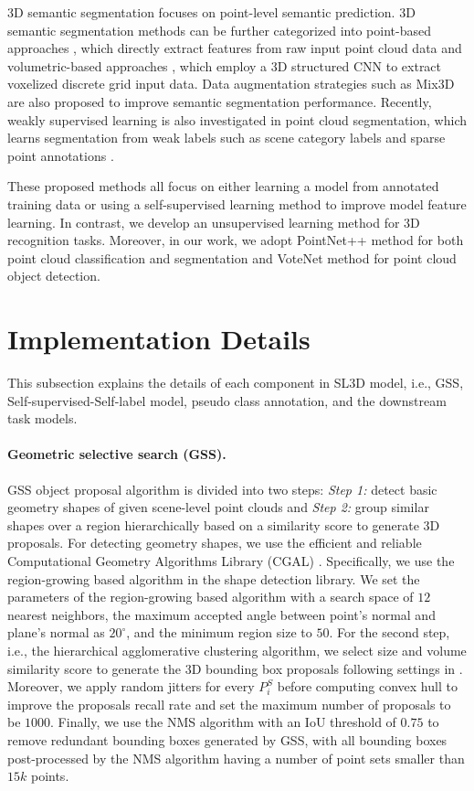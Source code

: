 \documentclass{article}
\begin{document}
{3D semantic segmentation} focuses on point-level semantic prediction. 3D semantic segmentation methods can be further categorized into point-based approaches \cite{qi2017pointnet,qi2017pointnetplusplus,zhao2021point,xu2021paconv}, which directly extract features from raw  input point cloud data and volumetric-based approaches \cite{choy20194d,graham20183d,hu2021bidirectional,hu2020jsenet} , which employ a 3D structured CNN to extract voxelized discrete grid input data. 
Data augmentation strategies such as Mix3D \cite{nekrasov2021mix3d} are also proposed to improve semantic segmentation performance. Recently, weakly supervised learning is also investigated in point cloud segmentation, which learns segmentation from weak labels such as scene category labels \cite{ren2021wypr} and sparse point annotations \cite{liu2021one}.

These proposed methods all focus on either learning a model from annotated training data or using a self-supervised learning method to improve model feature learning. In contrast, we develop an unsupervised learning method for 3D recognition tasks. Moreover, in our work, we adopt PointNet++ \cite{qi2017pointnetplusplus} method for both point cloud classification and segmentation and VoteNet \cite{qi2019deep} method for point cloud object detection. 

\section{Implementation Details}
\label{sec:implementation}
This subsection explains the details of each component in SL3D model, i.e., GSS, Self-supervised-Self-label model, pseudo class annotation, and the downstream task models.

\paragraph{Geometric selective search (GSS). }GSS object proposal algorithm is divided into two steps: \textit{Step 1: } detect basic geometry shapes of given scene-level point clouds and \textit{Step 2: } group similar shapes over a region hierarchically based on a similarity score to generate 3D proposals. For detecting geometry shapes, we use the efficient and reliable Computational Geometry Algorithms Library (CGAL) \cite{fabri2009cgal}. Specifically, we use the region-growing based algorithm in the shape detection library. We set the parameters of the region-growing based algorithm with a search space of $12$ nearest neighbors, the maximum accepted angle between point's normal and plane's normal as $20^{\circ}$, and the minimum region size to $50$. For the second step, i.e., the hierarchical agglomerative clustering algorithm, we select size and volume similarity score to generate the 3D bounding box proposals following settings in \cite{ren2021wypr}. Moreover, we apply random jitters for every $P^S_{i}$  before computing convex hull to improve the proposals recall rate and set the maximum number of proposals to be $1000$. Finally, we use the NMS algorithm with an IoU threshold of $0.75$ to remove redundant bounding boxes generated by GSS, with all bounding boxes post-processed by the NMS algorithm having a number of point sets smaller than $15k$ points. 
\end{document}
